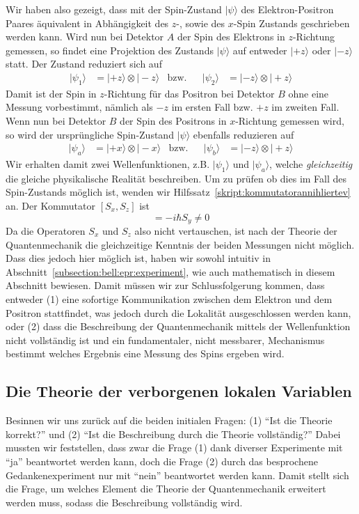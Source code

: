 \begin{refsection}
Wir haben also gezeigt, dass mit der Spin-Zustand $|\psi\rangle$ des
Elektron-Positron Paares \"aquivalent in Abh\"angigkeit des $z$-, sowie
des $x$-Spin Zustands geschrieben werden kann.
Wird nun bei Detektor $A$ der Spin des Elektrons in $z$-Richtung gemessen, 
so findet eine Projektion des Zustands $|\psi\rangle$ auf entweder
$|{+}z\rangle$ oder $|{-}z\rangle$ statt.
Der Zustand reduziert sich auf
\begin{align*}
    |\psi_{1}\rangle &= |{+}z\rangle \otimes |{-}z\rangle
    & \text{bzw.} && 
    |\psi_{2}\rangle &= |{-}z\rangle \otimes |{+}z\rangle
\end{align*}
Damit ist der Spin in $z$-Richtung f\"ur das Positron bei Detektor $B$ ohne
eine Messung vorbestimmt, n\"amlich als $-z$ im ersten Fall bzw. $+z$ im
zweiten Fall.
Wenn nun bei Detektor $B$ der Spin des Positrons in $x$-Richtung gemessen
wird, so wird der urspr\"ungliche Spin-Zustand $|\psi\rangle$
ebenfalls reduzieren auf
\begin{align*}
    |\psi_{a}\rangle &= |{+}x\rangle \otimes |{-}x\rangle
    & \text{bzw.} && 
    |\psi_{b}\rangle &= |{-}z\rangle \otimes |{+}z\rangle
\end{align*}
Wir erhalten damit zwei Wellenfunktionen, z.B. $|\psi_{1}\rangle$ und 
$|\psi_{a}\rangle$, welche \emph{gleichzeitig} die gleiche 
physikalische Realit\"at beschreiben.
Um zu pr\"ufen ob dies im Fall des Spin-Zustands m\"oglich ist, wenden
wir Hilfssatz~\ref{skript:kommutatorannihliertev} an.
Der Kommutator $[S_x,S_z]$ ist
\begin{equation}
    [S_x, S_z] =  -i \hbar S_y \neq 0
\end{equation}
Da die Operatoren $S_x$ und $S_z$ also nicht vertauschen, ist nach der Theorie
der Quantenmechanik die gleichzeitige Kenntnis der beiden Messungen nicht
m\"oglich.
Dass dies jedoch hier m\"oglich ist, haben wir sowohl intuitiv in
Abschnitt~\ref{subsection:bell:epr:experiment}, wie auch mathematisch in
diesem Abschnitt bewiesen. 
Damit m\"ussen wir zur Schlussfolgerung kommen, dass entweder 
(1) eine sofortige Kommunikation zwischen dem Elektron und dem Positron
stattfindet, was  jedoch durch die Lokalit\"at ausgeschlossen werden kann,
oder (2) dass die Beschreibung der Quantenmechanik mittels der Wellenfunktion
nicht  vollst\"andig ist und ein fundamentaler, nicht messbarer, Mechanismus
bestimmt welches Ergebnis eine Messung des Spins ergeben wird.


\subsection{Die Theorie der verborgenen lokalen Variablen}
Besinnen wir uns zur\"uck auf die beiden initialen Fragen: 
(1) \enquote{Ist die Theorie korrekt?} und 
(2) \enquote{Ist die Beschreibung durch die Theorie vollst\"andig?}
Dabei mussten wir feststellen, dass zwar die Frage (1) dank diverser
Experimente mit \enquote{ja} beantwortet werden kann, doch die Frage (2) 
durch das besprochene Gedankenexperiment nur mit \enquote{nein} beantwortet
werden kann. 
Damit stellt sich die Frage, um welches Element die Theorie der Quantenmechanik
erweitert werden muss, sodass die Beschreibung vollst\"andig wird.


\end{refsection}
